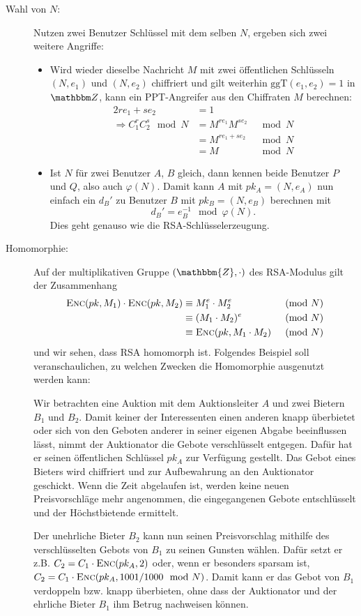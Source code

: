 \begin{description}
\item[Wahl von $N$:] Nutzen zwei Benutzer Schlüssel mit dem selben $N$,
  ergeben sich zwei weitere Angriffe:
  \begin{itemize}
  \item Wird wieder dieselbe Nachricht $M$ mit zwei öffentlichen
    Schlüsseln $(N, e_1)$ und $(N, e_2)$ chiffriert und gilt weiterhin
    $\text{ggT}(e_1, e_2) = 1$ in $\Z{}$, kann ein PPT-Angreifer aus den
    Chiffraten $M$ berechnen:
    \begin{alignat*}{2} re_1 + se_2 & = 1\\ \Longrightarrow C_1^rC_2^s
      \mod N &= M^{re_1}M^{se_2} &\mod N\\ &= M^{re_1 + se_2} &\mod N\\ &= M
      &\mod N
    \end{alignat*}
  \item Ist $N$ für zwei Benutzer $A$, $B$ gleich, dann kennen beide
    Benutzer $P$ und $Q$, also auch $\varphi(N)$. Damit kann $A$ mit $pk_A =
    (N, e_A)$ nun einfach ein $d_B'$ zu Benutzer $B$ mit $pk_B = (N, e_B)$
    berechnen mit
    \[d_B'=e_B^{-1} \mod \varphi(N).\] Dies geht genauso wie die
    RSA-Schlüsselerzeugung.
  \end{itemize}
\item[Homomorphie:]\indexRSAHomomorphie Auf der multiplikativen Gruppe
  $(\mathbbm{Z}, \cdot)$ des RSA-Modulus gilt der Zusammenhang
  \begin{alignat*}{2} \textsc{Enc}(pk, M_1) \cdot \textsc{Enc}(pk, M_2) &\equiv M_1^e
    \cdot M_2^e & \pmod N \\ &\equiv (M_1 \cdot M_2)^e & \pmod N\\ &\equiv
    \textsc{Enc}(pk, M_1 \cdot M_2) & \pmod N
  \end{alignat*} und wir sehen, dass RSA homomorph ist.  Folgendes
  Beispiel soll veranschaulichen, zu welchen Zwecken die Homomorphie
  ausgenutzt werden kann:
  \begin{beispiel} Wir betrachten eine Auktion mit dem Auktionsleiter
    $A$ und zwei Bietern $B_1$ und $B_2$. Damit keiner der Interessenten
    einen anderen knapp überbietet oder sich von den Geboten anderer in
    seiner eigenen Abgabe beeinflussen lässt, nimmt der Auktionator die
    Gebote verschlüsselt entgegen. Dafür hat er seinen öffentlichen
    Schlüssel $pk_A$ zur Verfügung gestellt. Das Gebot eines Bieters wird
    chiffriert und zur Aufbewahrung an den Auktionator geschickt. Wenn die
    Zeit abgelaufen ist, werden keine neuen Preisvorschläge mehr angenommen,
    die eingegangenen Gebote entschlüsselt und der Höchstbietende ermittelt.
    
    Der unehrliche Bieter $B_2$ kann nun seinen Preisvorschlag
    mithilfe des verschlüsselten Gebots von $B_1$ zu seinen Gunsten
    wählen. Dafür setzt er z.B. $C_2 = C_1 \cdot \textsc{Enc}({pk_A, 2})$ oder, wenn
    er besonders sparsam ist, $C_2 = C_1 \cdot \textsc{Enc}({pk_A, 1001/1000 \mod
      N})$. Damit kann er das Gebot von $B_1$ verdoppeln bzw. knapp
    überbieten, ohne dass der Auktionator und der ehrliche Bieter $B_1$ ihm
    Betrug nachweisen können.
  \end{beispiel}
\end{description}

